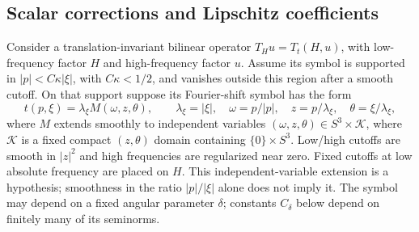 \documentclass[11pt,a4paper]{article}
\numberwithin{equation}{section}
\theoremstyle{definition}
\begin{document}
\subsection{Scalar corrections and Lipschitz coefficients}

Consider a translation-invariant bilinear operator $T_Hu=T_t(H,u)$, with low-frequency
factor $H$ and high-frequency factor $u$. Assume its symbol is supported in
$|p|<C\kappa|\xi|$, with $C\kappa<1/2$, and vanishes outside this
region after a smooth
cutoff. On that support suppose its
Fourier-shift symbol has the form
\begin{equation}\label{eq:analytic-extension}
t(p,\xi)=\lambda_\xi M(\omega,z,\theta),\qquad
\lambda_\xi=|\xi|,\quad \omega=p/|p|,\quad z=p/\lambda_\xi,\quad \theta=\xi/\lambda_\xi,
\end{equation}
where $M$ extends smoothly to independent variables
$(\omega,z,\theta)\in S^3\times\mathcal K$, where $\mathcal K$ is a
fixed compact $(z,\theta)$ domain containing $\{0\}\times S^3$.
Low/high cutoffs are smooth in $|z|^2$ and high frequencies are
regularized near zero. Fixed cutoffs at low absolute frequency are
placed on $H$. This independent-variable extension is a hypothesis;
smoothness in the ratio $|p|/|\xi|$ alone does not imply it.
The symbol may depend on a fixed angular parameter $\delta$;
constants $C_\delta$ below depend on finitely many of its seminorms.
\end{document}
